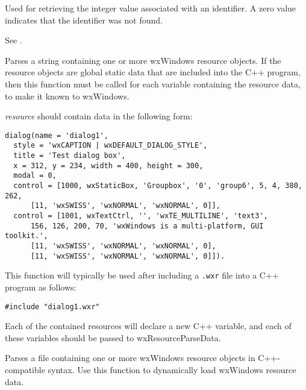 
Used for retrieving the integer value associated with an identifier.
A zero value indicates that the identifier was not found.

See .

\label{wxresourcedata}


Parses a string containing one or more wxWindows resource objects. If
the resource objects are global static data that are included into the
C++ program, then this function must be called for each variable
containing the resource data, to make it known to wxWindows.

{\it resource} should contain data in the following form:

\begin{verbatim}
dialog(name = 'dialog1',
  style = 'wxCAPTION | wxDEFAULT_DIALOG_STYLE',
  title = 'Test dialog box',
  x = 312, y = 234, width = 400, height = 300,
  modal = 0,
  control = [1000, wxStaticBox, 'Groupbox', '0', 'group6', 5, 4, 380, 262,
      [11, 'wxSWISS', 'wxNORMAL', 'wxNORMAL', 0]],
  control = [1001, wxTextCtrl, '', 'wxTE_MULTILINE', 'text3',
      156, 126, 200, 70, 'wxWindows is a multi-platform, GUI toolkit.',
      [11, 'wxSWISS', 'wxNORMAL', 'wxNORMAL', 0],
      [11, 'wxSWISS', 'wxNORMAL', 'wxNORMAL', 0]]).
\end{verbatim}

This function will typically be used after including a {\tt .wxr} file into
a C++ program as follows:

\begin{verbatim}
#include "dialog1.wxr"
\end{verbatim}

Each of the contained resources will declare a new C++ variable, and each
of these variables should be passed to wxResourceParseData.

\label{wxresourceparsefile}


Parses a file containing one or more wxWindows resource objects
in C++-compatible syntax. Use this function to dynamically load
wxWindows resource data.


